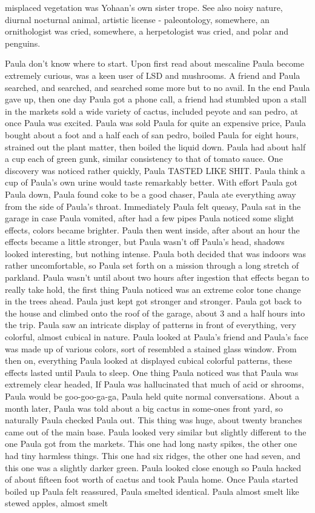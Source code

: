 \documentclass[12pt]{book}
\begin{document}
misplaced vegetation was Yohaan's own sister trope. See also noisy nature, diurnal nocturnal animal, artistic license - paleontology, somewhere, an ornithologist was cried, somewhere, a herpetologist was cried, and polar  and penguins.



Paula don't know where to start. Upon first read about mescaline Paula become extremely curious, was a keen user of LSD and mushrooms. A friend and Paula searched, and searched, and searched some more but to no avail. In the end Paula gave up, then one day Paula got a phone call, a friend had stumbled upon a stall in the markets sold a wide variety of cactus, included peyote and san pedro, at once Paula was excited. Paula was sold Paula for quite an expensive price, Paula bought about a foot and a half each of san pedro, boiled Paula for eight hours, strained out the plant matter, then boiled the liquid down. Paula had about half a cup each of green gunk, similar consistency to that of tomato sauce. One discovery was noticed rather quickly, Paula TASTED LIKE SHIT. Paula think a cup of Paula's own urine would taste remarkably better. With effort Paula got Paula down, Paula found coke to be a good chaser, Paula ate everything away from the side of Paula's throat. Immediately Paula felt queasy, Paula sat in the garage in case Paula vomited, after had a few pipes Paula noticed some slight effects, colors became brighter. Paula then went inside, after about an hour the effects became a little stronger, but Paula wasn't off Paula's head, shadows looked interesting, but nothing intense. Paula both decided that was indoors was rather uncomfortable, so Paula set forth on a mission through a long stretch of parkland. Paula wasn't until about two hours after ingestion that effects began to really take hold, the first thing Paula noticed was an extreme color tone change in the trees ahead. Paula just kept got stronger and stronger. Paula got back to the house and climbed onto the roof of the garage, about 3 and a half hours into the trip. Paula saw an intricate display of patterns in front of everything, very colorful, almost cubical in nature. Paula looked at Paula's friend and Paula's face was made up of various colors, sort of resembled a stained glass window. From then on, everything Paula looked at displayed cubical colorful patterns, these effects lasted until Paula to sleep. One thing Paula noticed was that Paula was extremely clear headed, If Paula was hallucinated that much of acid or shrooms, Paula would be goo-goo-ga-ga, Paula held quite normal conversations. About a month later, Paula was told about a big cactus in some-ones front yard, so naturally Paula checked Paula out. This thing was huge, about twenty branches came out of the main base. Paula looked very similar but slightly different to the one Paula got from the markets. This one had long nasty spikes, the other one had tiny harmless things. This one had six ridges, the other one had seven, and this one was a slightly darker green. Paula looked close enough so Paula hacked of about fifteen foot worth of cactus and took Paula home. Once Paula started boiled up Paula felt reassured, Paula smelted identical. Paula almost smelt like stewed apples, almost smelt 
\end{document}
